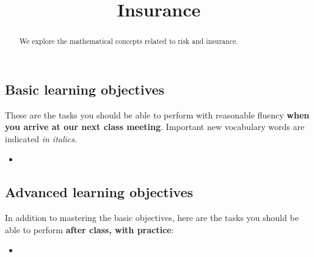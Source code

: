 \documentclass{ximera}
\title{Insurance}
\begin{document}
\begin{abstract}
We explore the mathematical concepts related to risk and insurance.
\end{abstract}
\maketitle

\subsection*{Basic learning objectives}

These are the tasks you should be able to perform with reasonable fluency \textbf{when you arrive at our next class meeting}. Important new vocabulary words are indicated \emph{in italics}. 

\begin{itemize}
	\item 
\end{itemize}

\subsection*{Advanced learning objectives}

In addition to mastering the basic objectives, here are the tasks you should be able to perform \textbf{after class, with practice}: 

\begin{itemize}
	\item 
\end{itemize}
\end{document}
